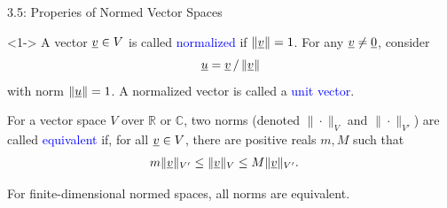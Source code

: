 \documentclass[10pt,english,aspectratio=169]{beamer}
\begin{document}
\begin{frame}{3.5: Properies of Normed Vector Spaces}

\begin{definition}<1->
A vector $\underline{v} \in V$ is called \textcolor{blue}{normalized} if $\left\| \underline{v} \right\| = 1$.
For any $\underline{v} \neq \underline{0}$, consider \vspace{-2mm}
\begin{equation*}
\underline{u} = \underline{v}\, / \left\| \underline{v} \right\|
\end{equation*}
with norm $\left\| \underline{u} \right\| = 1$.
A normalized vector is called a \textcolor{blue}{unit vector}.
\end{definition}


\begin{definition}
For a vector space $V$ over $\mathbb{R}$ or $\mathbb{C}$, two norms (denoted $\|\cdot\|_{V}$ and $\|\cdot\|_{V'}$) are called \textcolor{blue}{equivalent} if, for all $\underline{v} \in V$, there are positive reals $m,M$ such that
\begin{align*} 
m \| \underline{v} \|_{V'} & \leq \| \underline{v} \|_V \leq M \| \underline{v} \|_{V'}.
\end{align*}
\end{definition}

\begin{lemma} 
For finite-dimensional normed spaces, all norms are equivalent.
\end{lemma}

\end{frame}
\end{document}
